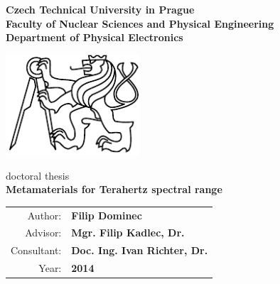 
\begin{center}
\textbf{
Czech Technical University in Prague\\
Faculty of Nuclear Sciences and Physical Engineering\\ 
Department of Physical Electronics\\
 }
 \vspace{1cm}

\includegraphics[width=5cm]{img/LogoCVUT}
\vspace{4cm}

\large{doctoral thesis}\\
\vspace{5mm}
\textbf{\huge Metamaterials for Terahertz spectral range\\}
\end{center}

\date{ } 			
 
 \vfill
 \begin{tabular}{rl}
  Author: 	&\textbf{Filip Dominec}\\
  Advisor: 	&\textbf{Mgr. Filip Kadlec, Dr.}\\
  Consultant: 	&\textbf{Doc. Ing. Ivan Richter, Dr.}\\ 
  Year:		&\textbf{2014}\\
  \end{tabular}

\thispagestyle{empty}

\tableofcontents
